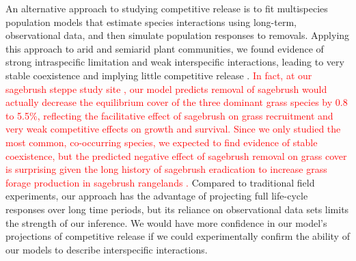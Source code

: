 \documentclass[11pt]{article}
\newcommand{\new}{\textcolor{red}}
\begin{document}
\begin{doublespacing}
An alternative approach to studying competitive release is to fit multispecies population models that estimate species interactions using long-term, observational data, and then simulate population responses to removals. Applying this approach to arid and semiarid plant communities, we found evidence of strong intraspecific limitation and weak interspecific interactions, leading to very stable coexistence and implying little competitive release \citep{adler_coexistence_2010,chu_large_2015}.\new{ In fact, at our sagebrush steppe study site  \citep{adler_coexistence_2010}, our model predicts removal of sagebrush would actually decrease the equilibrium cover of the three dominant grass species by 0.8 to 5.5\%, reflecting the facilitative effect of sagebrush on grass recruitment and very weak competitive effects on growth and survival.  Since we only studied the most common, co-occurring species, we expected to find evidence of stable coexistence, but the predicted negative effect of sagebrush removal on grass cover is surprising given the long history of sagebrush eradication to increase grass forage production in
 sagebrush rangelands \citep{Cook1963, Mueggler1958, Robertson1947}.} %
Compared to traditional field experiments, our approach has the advantage of projecting full life-cycle responses over long time periods, but its reliance on observational data sets limits the strength of our inference. We would have more confidence in our model's projections of competitive release if we could experimentally confirm the ability of our models to describe interspecific interactions.


\end{doublespacing}
\end{document}

